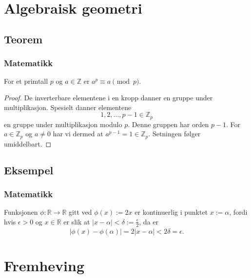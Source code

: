\documentclass[norsk]{beamer}
\begin{document}
\section{Algebraisk geometri}

\subsection{Teorem}

\begin{frame}
    \frametitle{Matematikk}

    \begin{theorem}
        For et primtall $p$ og $a \in \mathbb{Z}$ er $a^p \equiv a \pmod{p}$.
    \end{theorem}
    
    \begin{proof}
        De inverterbare elementene i en kropp danner en gruppe under multi\-plikasjon. Spesielt danner elementene 
        \[
            1, 2, \ldots, p-1 \in \mathbb{Z}_p
        \] 
        en gruppe under multiplikasjon modulo $p$. Denne gruppen har orden $p-1$. For $a \in \mathbb{Z}_p$ og $a \neq 0$ har vi dermed at $a^{p-1} = 1 \in \mathbb{Z}_p$. Setningen følger umiddelbart.
    \end{proof}   
\end{frame}

\subsection{Eksempel}

\begin{frame}
    \frametitle{Matematikk}
    
    \begin{example}
        Funksjonen $\phi \colon \mathbb{R} \to \mathbb{R}$ gitt ved $\phi(x) := 2x$ er kontinuerlig i punktet $x := \alpha$, fordi hvis $\epsilon > 0$ og $x \in \mathbb{R}$ er slik at $|x - \alpha| < \delta := \frac{\epsilon}{2}$, da er
        \begin{align*}
            |\phi(x) - \phi(\alpha)| = 2|x - \alpha| < 2\delta = \epsilon.
        \end{align*}
    \end{example}
\end{frame}

\section{Fremheving}
\end{document}
